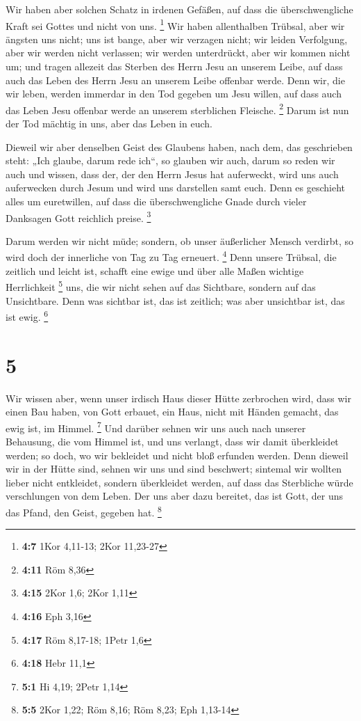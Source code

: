  Wir haben aber solchen Schatz in irdenen Gefäßen, auf dass
die überschwengliche Kraft sei Gottes und nicht von uns. \footnote{\textbf{4:7}
  1Kor 4,11-13; 2Kor 11,23-27}  Wir haben allenthalben
Trübsal, aber wir ängsten uns nicht; uns ist bange, aber wir verzagen
nicht;  wir leiden Verfolgung, aber wir werden nicht
verlassen; wir werden unterdrückt, aber wir kommen nicht um;
 und tragen allezeit das Sterben des Herrn Jesu an unserem
Leibe, auf dass auch das Leben des Herrn Jesu an unserem Leibe offenbar
werde.  Denn wir, die wir leben, werden immerdar in den Tod
gegeben um Jesu willen, auf dass auch das Leben Jesu offenbar werde an
unserem sterblichen Fleische. \footnote{\textbf{4:11} Röm 8,36}
 Darum ist nun der Tod mächtig in uns, aber das Leben in
euch.

 Dieweil wir aber denselben Geist des Glaubens haben, nach
dem, das geschrieben steht: „Ich glaube, darum rede ich``, so glauben
wir auch, darum so reden wir auch  und wissen, dass der,
der den Herrn Jesus hat auferweckt, wird uns auch auferwecken durch
Jesum und wird uns darstellen samt euch.  Denn es geschieht
alles um euretwillen, auf dass die überschwengliche Gnade durch vieler
Danksagen Gott reichlich preise. \footnote{\textbf{4:15} 2Kor 1,6; 2Kor
  1,11}

 Darum werden wir nicht müde; sondern, ob unser äußerlicher
Mensch verdirbt, so wird doch der innerliche von Tag zu Tag erneuert.
\footnote{\textbf{4:16} Eph 3,16}  Denn unsere Trübsal, die
zeitlich und leicht ist, schafft eine ewige und über alle Maßen wichtige
Herrlichkeit \footnote{\textbf{4:17} Röm 8,17-18; 1Petr 1,6}
 uns, die wir nicht sehen auf das Sichtbare, sondern auf
das Unsichtbare. Denn was sichtbar ist, das ist zeitlich; was aber
unsichtbar ist, das ist ewig. \footnote{\textbf{4:18} Hebr 11,1}

\hypertarget{section-2}{%
\section{5}\label{section-2}}

 Wir wissen aber, wenn unser irdisch Haus dieser Hütte
zerbrochen wird, dass wir einen Bau haben, von Gott erbauet, ein Haus,
nicht mit Händen gemacht, das ewig ist, im Himmel. \footnote{\textbf{5:1}
  Hi 4,19; 2Petr 1,14}  Und darüber sehnen wir uns auch nach
unserer Behausung, die vom Himmel ist, und uns verlangt, dass wir damit
überkleidet werden;  so doch, wo wir bekleidet und nicht
bloß erfunden werden.  Denn dieweil wir in der Hütte sind,
sehnen wir uns und sind beschwert; sintemal wir wollten lieber nicht
entkleidet, sondern überkleidet werden, auf dass das Sterbliche würde
verschlungen von dem Leben.  Der uns aber dazu bereitet, das
ist Gott, der uns das Pfand, den Geist, gegeben hat. \footnote{\textbf{5:5}
  2Kor 1,22; Röm 8,16; Röm 8,23; Eph 1,13-14}

